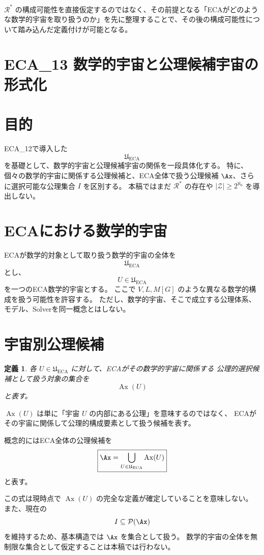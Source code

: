 \documentclass[11pt,a4paper]{article}
\newtheorem{definition}{定義}
\begin{document}
\(\mathcal{R}^{*}\) の構成可能性を直接仮定するのではなく、その前提となる「ECAがどのような数学的宇宙を取り扱うのか」を先に整理することで、その後の構成可能性について踏み込んだ定義付けが可能となる。




\section{ECA\_13 数学的宇宙と公理候補宇宙の形式化}

\section{目的}
ECA\_12で導入した
\[
\mathfrak{U}_{\mathrm{ECA}}
\]
を基礎として、数学的宇宙と公理候補宇宙の関係を一段具体化する。
特に、個々の数学的宇宙に関係する公理候補と、ECA全体で扱う公理候補
\(\Ax\)、さらに選択可能な公理集合 \(I\) を区別する。
本稿ではまだ \(\mathcal{R}^*\) の存在や
\(|\mathcal{Z}|\ge2^{\aleph_0}\) を導出しない。

\section{ECAにおける数学的宇宙}
ECAが数学的対象として取り扱う数学的宇宙の全体を
\[
\mathfrak{U}_{\mathrm{ECA}}
\]
とし、
\[
U\in\mathfrak{U}_{\mathrm{ECA}}
\]
を一つのECA数学的宇宙とする。
ここで \(V,L,M[G]\) のような異なる数学的構成を扱う可能性を許容する。
ただし、数学的宇宙、そこで成立する公理体系、モデル、Solverを同一概念とはしない。

\section{宇宙別公理候補}
\begin{definition}
各 \(U\in\mathfrak{U}_{\mathrm{ECA}}\) に対して、ECAがその数学的宇宙に関係する
公理的選択候補として扱う対象の集合を
\[
\operatorname{Ax}(U)
\]
と表す。
\end{definition}

\(\operatorname{Ax}(U)\) は単に「宇宙 \(U\) の内部にある公理」を意味するのではなく、
ECAがその宇宙に関係して公理的構成要素として扱う候補を表す。

概念的にはECA全体の公理候補を
\[
\boxed{
\Ax=
\bigcup_{U\in\mathfrak{U}_{\mathrm{ECA}}}\operatorname{Ax}(U)
}
\]
と表す。

この式は現時点で \(\operatorname{Ax}(U)\) の完全な定義が確定していることを意味しない。
また、現在の
\[
I\subseteq\mathcal{P}(\Ax)
\]
を維持するため、基本構造では \(\Ax\) を集合として扱う。
数学的宇宙の全体を無制限な集合として仮定することは本稿では行わない。
\end{document}
